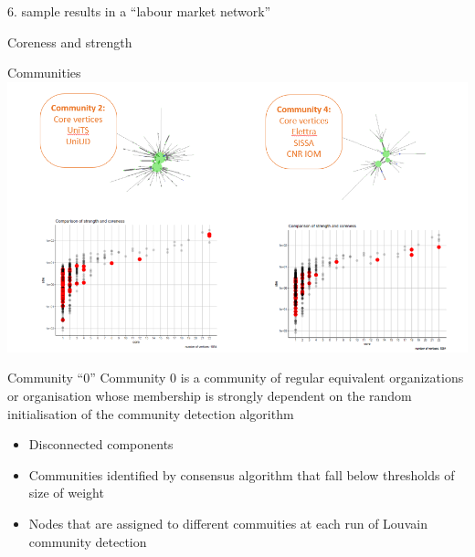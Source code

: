 \documentclass[
  ignorenonframetext,
]{beamer}
\begin{document}
\begin{frame}{6. sample results in a ``labour market network''}
\protect\hypertarget{sample-results-in-a-labour-market-network}{}
\begin{block}{Coreness and strength}
\protect\hypertarget{coreness-and-strength-1}{}
\end{block}

\begin{block}{Communities}
\protect\hypertarget{communities}{}
\includegraphics[width=5.9375in,height=\textheight]{images/paste-484EE1EF.png}
\end{block}

\begin{block}{Community ``0''}
\protect\hypertarget{community-0}{}
Community 0 is a community of regular equivalent organizations or
organisation whose membership is strongly dependent on the random
initialisation of the community detection algorithm

\begin{itemize}
\item
  Disconnected components
\item
  Communities identified by consensus algorithm that fall below
  thresholds of size of weight
\item
  Nodes that are assigned to different commuities at each run of Louvain
  community detection
\end{itemize}
\end{block}


\end{frame}
\end{document}
